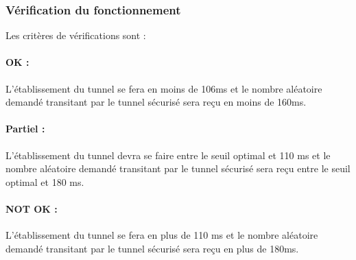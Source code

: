 \documentclass[a4paper,11pt,french]{article}
\begin{document}
\subsubsection{Vérification du fonctionnement}
	Les critères de vérifications sont :
\paragraph{OK : } L'établissement du tunnel se fera en moins de 106ms et le
nombre aléatoire demandé transitant par le tunnel sécurisé sera reçu en
moins de 160ms.
\paragraph{Partiel : } L'établissement du tunnel devra se faire entre le
seuil optimal et 110 ms et le nombre aléatoire demandé transitant par le
tunnel sécurisé sera reçu entre le seuil optimal et 180 ms.
\paragraph{NOT OK : } L'établissement du tunnel se fera en plus de 110 ms
et le nombre aléatoire demandé transitant par le tunnel sécurisé sera reçu
en plus de 180ms.
\end{document}
